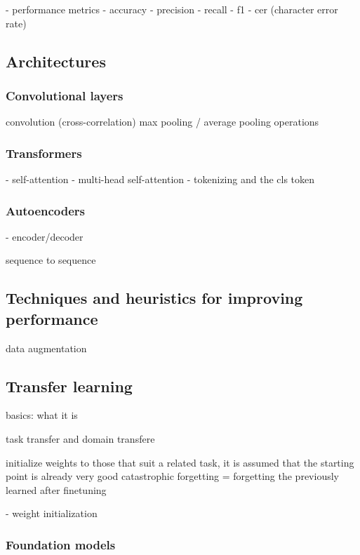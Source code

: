 \documentclass{article}
\begin{document}
- performance metrics
    - accuracy
	- precision
	- recall 
	- f1
    - cer (character error rate)

\subsection{Architectures}

\subsubsection{Convolutional layers}

convolution (cross-correlation)
max pooling / average pooling operations

\subsubsection{Transformers}

- self-attention
- multi-head self-attention
- tokenizing and the cls token

\subsubsection{Autoencoders}

- encoder/decoder

sequence to sequence \cite{sutskever2014sequence}

\subsection{Techniques and heuristics for improving performance}

data augmentation

\subsection{Transfer learning}

basics: what it is 

task transfer and domain transfere

initialize weights to those that suit a related task, it is assumed that the starting point is already very good
catastrophic forgetting = forgetting the previously learned after finetuning

- weight initialization

\subsubsection{Foundation models}
\end{document}
